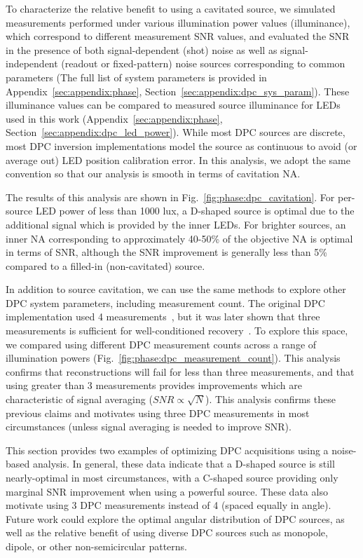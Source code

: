\clearpage
To characterize the relative benefit to using a cavitated source, we simulated measurements performed under various illumination power values (illuminance), which correspond to different measurement SNR values, and evaluated the SNR in the presence of both signal-dependent (shot) noise as well as signal-independent (readout or fixed-pattern) noise sources corresponding to common parameters (The full list of system parameters is provided in Appendix~\ref{sec:appendix:phase}, Section~\ref{sec:appendix:dpc_sys_param}). These illuminance values can be compared to measured source illuminance for LEDs used in this work (Appendix~\ref{sec:appendix:phase}, Section~\ref{sec:appendix:dpc_led_power}). While most DPC sources are discrete, most DPC inversion implementations model the source as continuous to avoid (or average out) LED position calibration error. In this analysis, we adopt the same convention so that our analysis is smooth in terms of cavitation NA.

The results of this analysis are shown in Fig.~\ref{fig:phase:dpc_cavitation}. For per-source LED power of less than 1000 lux, a D-shaped source is optimal due to the additional signal which is provided by the inner LEDs. For brighter sources, an inner NA corresponding to approximately 40-50\% of the objective NA is optimal in terms of SNR, although the SNR improvement is generally less than 5\% compared to a filled-in (non-cavitated) source.

In addition to source cavitation, we can use the same methods to explore other DPC system parameters, including measurement count. The original DPC implementation used 4 measurements~\cite{tian2015quantitative}, but it was later shown that three measurements is sufficient for well-conditioned recovery~\cite{PhillipsChen17cDPC}. To explore this space, we compared using different DPC measurement counts across a range of illumination powers (Fig.~\ref{fig:phase:dpc_measurement_count}). This analysis confirms that reconstructions will fail for less than three measurements, and that using greater than 3 measurements provides improvements which are characteristic of signal averaging ($SNR \propto \sqrt{N}$). This analysis confirms these previous claims and motivates using three DPC measurements in most circumstances (unless signal averaging is needed to improve SNR).

This section provides two examples of optimizing DPC acquisitions using a noise-based analysis. In general, these data indicate that a D-shaped source is still nearly-optimal in most circumstances, with a C-shaped source providing only marginal SNR improvement when using a powerful source. These data also motivate using 3 DPC measurements instead of 4 (spaced equally in angle). Future work could explore the optimal angular distribution of DPC sources, as well as the relative benefit of using diverse DPC sources such as monopole, dipole, or other non-semicircular patterns.

